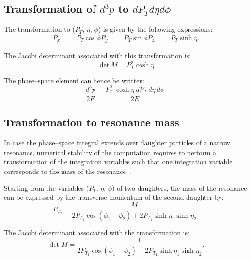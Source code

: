\subsection{Transformation of $d^{3}p$ to $dP_{T} d\eta d\phi$}

The transformation to ($P_T$, $\eta$, $\phi$) is given by the following expressions:
\begin{eqnarray*}
P_{x} & = & P_{T} \cos \phi
P_{y} & = & P_{T} \sin \phi
P_{z} & = & P_{T} \sinh \eta.
\end{eqnarray*}

The Jacobi determinant associated with this transformation is:
\begin{equation*}
\det M = P_{T}^2 \cosh \eta
\end{equation*}

The phase--space element can hence be written:
\begin{equation*}
\frac{d^3p}{2 E} = \frac{{P_{T}^2 \ \cosh\eta \ dP_{T} \ d\eta \ d\phi}}{2 E}.
\end{equation*}

\subsection{Transformation to resonance mass}

In case the phase--space integral extends over daughter particles of a narrow resonance,
numerical stability of the computation requires to perform a transformation of the integration variables
such that one integration variable corresponds to the mass of the resonance~\cite{Artoisenet:2010cn}.

Starting from the variables ($P_T$, $\eta$, $\phi$) of two daughters, the mass of the resonance can be expressed by the transverse momentum of the second daughter by:
\begin{equation*}
P_{T_{2}} = \frac{M}{2 P_{T_{1}} \cos(\phi_{1} - \phi_{2}) + 2 P_{T_{1}} \sinh\eta_{1} \sinh\eta_{2}}.
\end{equation*}

The Jacobi determinant associated with the transformation is:
\begin{equation*}
\det M = \frac{1}{2 P_{T_{1}} \cos(\phi_{1} - \phi_{2}) + 2 P_{T_{1}} \sinh\eta_{1} \sinh\eta_{2}}.
\end{equation*}


